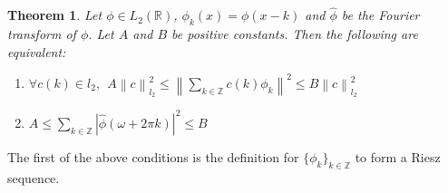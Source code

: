 \documentclass[12pt]{article}
\newtheorem{theorem}{Theorem}
\begin{document}
\begin{theorem}
Let $\phi \in L_2(\mathbb{R})$, $\phi_k(x) = \phi(x-k)$ and
$\hat{\phi}$ be the Fourier transform of $\phi$. Let $A$ and $B$
be positive constants. Then the following are equivalent:
\begin{enumerate}
\item $\forall c(k) \in l_2,\ \   A\left\|c\right\|^2_{l_2} \leq
\left\|\sum_{k\in \mathbb{Z}}c(k)\phi_k\right\|^2\leq
B\left\|c\right\|^2_{l_2}$ \item $
A\leq\sum_{k\in\mathbb{Z}}\left|\hat{\phi}(\omega + 2\pi
k)\right|^2\leq B$
\end{enumerate}
\end{theorem}

The first of the above conditions is the definition for
$\{\phi_k\}_{k\in\mathbb{Z}}$ to form a Riesz sequence. 
\end{document}
